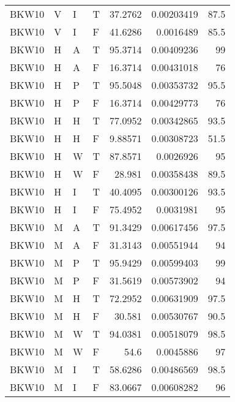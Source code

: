 \begin{longtable}{llllrrr}
    BKW10    & V     & I     & T          & 37.2762    & 0.00203419  & 87.5     \\
    BKW10    & V     & I     & F          & 41.6286    & 0.0016489   & 85.5     \\
    BKW10    & H     & A     & T          & 95.3714    & 0.00409236  & 99       \\
    BKW10    & H     & A     & F          & 16.3714    & 0.00431018  & 76       \\
    BKW10    & H     & P     & T          & 95.5048    & 0.00353732  & 95.5     \\
    BKW10    & H     & P     & F          & 16.3714    & 0.00429773  & 76       \\
    BKW10    & H     & H     & T          & 77.0952    & 0.00342865  & 93.5     \\
    BKW10    & H     & H     & F          & 9.88571    & 0.00308723  & 51.5     \\
    BKW10    & H     & W     & T          & 87.8571    & 0.0026926   & 95       \\
    BKW10    & H     & W     & F          & 28.981     & 0.00358438  & 89.5     \\
    BKW10    & H     & I     & T          & 40.4095    & 0.00300126  & 93.5     \\
    BKW10    & H     & I     & F          & 75.4952    & 0.0031981   & 95       \\
    BKW10    & M     & A     & T          & 91.3429    & 0.00617456  & 97.5     \\
    BKW10    & M     & A     & F          & 31.3143    & 0.00551944  & 94       \\
    BKW10    & M     & P     & T          & 95.9429    & 0.00599403  & 99       \\
    BKW10    & M     & P     & F          & 31.5619    & 0.00573902  & 94       \\
    BKW10    & M     & H     & T          & 72.2952    & 0.00631909  & 97.5     \\
    BKW10    & M     & H     & F          & 30.581     & 0.00530767  & 90.5     \\
    BKW10    & M     & W     & T          & 94.0381    & 0.00518079  & 98.5     \\
    BKW10    & M     & W     & F          & 54.6       & 0.0045886   & 97       \\
    BKW10    & M     & I     & T          & 58.6286    & 0.00486569  & 98.5     \\
    BKW10    & M     & I     & F          & 83.0667    & 0.00608282  & 96       \\

\end{longtable}

